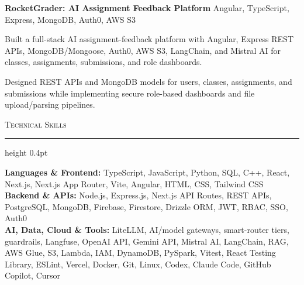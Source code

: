 \documentclass[letterpaper,11pt]{article}
\newcommand{\resumesection}[1]{%
  \par\vspace{2pt}%
  {\large\scshape #1}\par\vspace{2pt}%
  \hrule height 0.4pt\vspace{2pt}%
}
\newcommand{\projectHeading}[2]{
  \textbf{#1} \hfill #2
}
\begin{document}
\projectHeading{RocketGrader: AI Assignment Feedback Platform}{Angular, TypeScript, Express, MongoDB, Auth0, AWS S3}
\begin{tightitemize}
  \item Built a full-stack AI assignment-feedback platform with Angular, Express REST APIs, MongoDB/Mongoose, Auth0, AWS S3, LangChain, and Mistral AI for classes, assignments, submissions, and role dashboards.
  \item Designed REST APIs and MongoDB models for users, classes, assignments, and submissions while implementing secure role-based dashboards and file upload/parsing pipelines.
\end{tightitemize}

\resumesection{Technical Skills}
\textbf{Languages \& Frontend:} TypeScript, JavaScript, Python, SQL, C++, React, Next.js, Next.js App Router, Vite, Angular, HTML, CSS, Tailwind CSS\\
\textbf{Backend \& APIs:} Node.js, Express.js, Next.js API Routes, REST APIs, PostgreSQL, MongoDB, Firebase, Firestore, Drizzle ORM, JWT, RBAC, SSO, Auth0\\
\textbf{AI, Data, Cloud \& Tools:} LiteLLM, AI/model gateways, smart-router tiers, guardrails, Langfuse, OpenAI API, Gemini API, Mistral AI, LangChain, RAG, AWS Glue, S3, Lambda, IAM, DynamoDB, PySpark, Vitest, React Testing Library, ESLint, Vercel, Docker, Git, Linux, Codex, Claude Code, GitHub Copilot, Cursor
\end{document}
